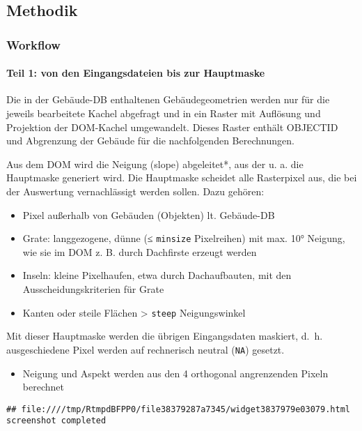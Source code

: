 \documentclass[
]{article}
\providecommand{\tightlist}{%
  \setlength{\itemsep}{0pt}\setlength{\parskip}{0pt}}
\begin{document}
\subsection{Methodik}\label{methodik}

\subsubsection{Workflow}\label{workflow}

\paragraph{Teil 1: von den Eingangsdateien bis zur
Hauptmaske}\label{teil-1-von-den-eingangsdateien-bis-zur-hauptmaske}

Die in der Gebäude-DB enthaltenen Gebäudegeometrien werden nur für die
jeweils bearbeitete Kachel abgefragt und in ein Raster mit Auflösung und
Projektion der DOM-Kachel umgewandelt. Dieses Raster enthält OBJECTID
und Abgrenzung der Gebäude für die nachfolgenden Berechnungen.

Aus dem DOM wird die Neigung (slope) abgeleitet*, aus der u. a. die
Hauptmaske generiert wird. Die Hauptmaske scheidet alle Rasterpixel aus,
die bei der Auswertung vernachlässigt werden sollen. Dazu gehören:

\begin{itemize}
\tightlist
\item
  Pixel außerhalb von Gebäuden (Objekten) lt. Gebäude-DB
\item
  Grate: langgezogene, dünne (≤ \texttt{minsize} Pixelreihen) mit max.
  10° Neigung, wie sie im DOM z. B. durch Dachfirste erzeugt werden
\item
  Inseln: kleine Pixelhaufen, etwa durch Dachaufbauten, mit den
  Ausscheidungskriterien für Grate
\item
  Kanten oder steile Flächen \textgreater{} \texttt{steep}
  Neigungswinkel
\end{itemize}

Mit dieser Hauptmaske werden die übrigen Eingangsdaten maskiert, d.~h.
ausgeschiedene Pixel werden auf rechnerisch neutral (\texttt{NA})
gesetzt.

\begin{itemize}
\tightlist
\item
  Neigung und Aspekt werden aus den 4 orthogonal angrenzenden Pixeln
  berechnet
\end{itemize}

\begin{verbatim}
## file:////tmp/RtmpdBFPP0/file38379287a7345/widget3837979e03079.html screenshot completed
\end{verbatim}
\end{document}
